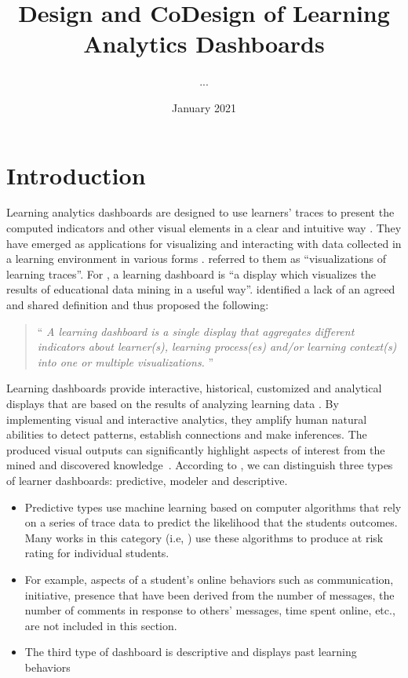 \documentclass[preprint,12pt]{elsarticle}
\title{Design and CoDesign of Learning Analytics Dashboards}
\author{...}
\date{January 2021}
\begin{document}
\maketitle

\section{Introduction} 
Learning analytics dashboards are designed to use learners' traces to present the computed indicators and other visual elements in a clear and intuitive way \citep{Brouns2015}.
They have emerged as applications for visualizing and interacting with data collected in a learning environment in various forms \citep{Ramos2015}. \citet{Steiner2014} referred to them as ``visualizations of learning traces''. For \citet{Yoo2015}, a learning dashboard is ``a display which visualizes the results of educational data mining in a useful way''. 
\citet{Schwendimann2017} identified a lack of an agreed and shared definition and thus proposed the following:
\begin{quotation}
	``\textit{%
		A learning dashboard is a single display that aggregates different indicators
		about learner(s), learning process(es) and/or learning context(s) into one or
		multiple visualizations.
	}'' \citep{Schwendimann2017}
\end{quotation}
Learning dashboards provide interactive, historical, customized and analytical displays that are based on the results of  analyzing learning data \citep{Park2015, Kim2015}. By implementing visual and interactive analytics, they amplify human natural abilities to detect patterns, establish connections and make inferences. The produced visual outputs can significantly highlight aspects of interest from the mined and discovered knowledge~\citep{Duval2011}. According to \citet{bennett2019four}, we can distinguish  three types of learner dashboards: predictive, modeler and descriptive. 
\begin{itemize}
    \item Predictive types use machine learning based on computer algorithms that rely on a series of trace data to predict the likelihood that the students outcomes. Many works in this category (i.e, \citep{arnold2014exercise}) use these algorithms to produce at risk rating for individual students.
    \item For example, aspects of a student's online behaviors such as communication, initiative, presence that have been derived from the number of messages, the number of comments in response to others' messages, time spent online, etc., are not included in this section. 
    \item The third type of dashboard is descriptive and displays past learning behaviors
\end{itemize}
\end{document}

